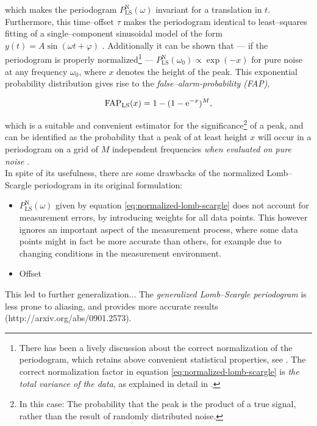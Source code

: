 which makes the periodogram $P^{\text{N}}_{\text{LS}}(\omega)$ invariant for a translation in $t$. Furthermore, this time--offset $\tau$ makes the periodogram identical to least--squares fitting of a single--component sinusoidal model of the form $y(t) = A \sin(\omega t + \varphi)$ \citep{horne1986, vanderplas2015}. Additionally it can be shown that --- if the periodogram is properly normalized\footnote{There has been a lively discussion about the correct normalization of the periodogram, which retains above convenient statistical properties, see \citet{lomb1976,astroML,zechmeister2009}. The correct normalization factor in equation \eqref{eq:normalized-lomb-scargle} is \emph{the total variance of the data}, as explained in detail in \citet{horne1986}.} --- $P^{\text{N}}_{\text{LS}}(\omega_0) \propto \exp(-x)$ for pure noise at any frequency $\omega_0$, where $x$ denotes the height of the peak. This exponential probability distribution gives rise to the \emph{false--alarm-probability (FAP)},

\begin{equation}
\text{FAP}_{\text{LS}}(x) = 1 - (1 - \mathrm{e}^{-x})^M,
\end{equation}

which is a suitable and convenient estimator for the significance\footnote{In this case: The probability that the peak is the product of a true signal, rather than the result of randomly distributed noise.} of a peak, and can be identified as the probability that a peak of at least height $x$ will occur in a periodogram on a grid of $M$ independent frequencies \emph{when evaluated on pure noise} \citep{horne1986}.\\

In spite of its usefulness, there are some drawbacks of the normalized Lomb--Scargle periodogram in its original formulation:

\begin{itemize}
\item $P^{\text{N}}_{\text{LS}}(\omega)$ given by equation \eqref{eq:normalized-lomb-scargle} does not account for measurement errors, \eg by introducing weights for all data points. This however ignores an important aspect of the measurement process, where some data points might in fact be more accurate than others, for example due to changing conditions in the measurement environment.
\item Offset %
\end{itemize}

This led to further generalization...
The \emph{generalized Lomb--Scargle periodogram} is less prone to aliasing, and provides more accurate results (http://arxiv.org/abs/0901.2573).

